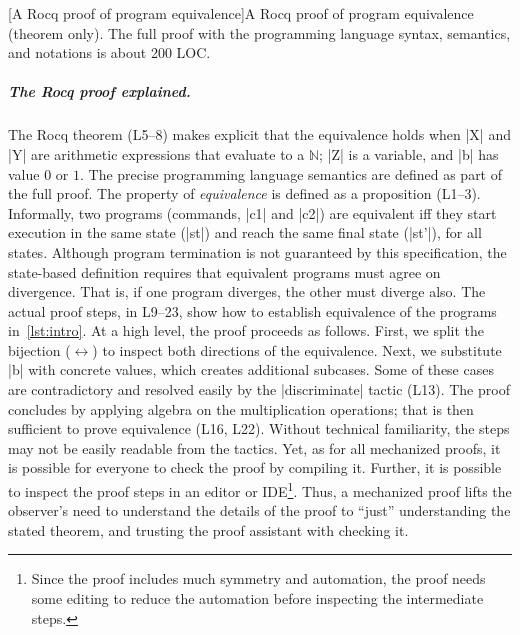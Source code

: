 \begin{center}
\begin{minipage}{\textwidth}
\captionsetup{type=lstlisting}
[A Rocq proof of program equivalence]{A Rocq proof of program equivalence (theorem only).
The full proof with the programming language syntax, semantics, and notations is about 200 LOC.}
\label{lst:eq-proof}
\end{minipage}
\end{center}

\subparagraph*{The Rocq proof explained.}
The Rocq theorem (L5--8) makes explicit that the equivalence holds when
\pr|X| and \pr|Y| are arithmetic expressions that evaluate to a \(\mathbb{N}\); \pr|Z| is a variable, and \pr|b| has value \(0\) or \(1\).
The precise programming language semantics are defined as part of the full proof.
The property of \emph{equivalence} is defined as a proposition (L1--3).
Informally, two programs (commands, \pr|c1| and \pr|c2|) are equivalent
iff they start execution in the same state (\pr|st|) and reach the same final state (\pr|st'|), for all states.
Although program termination is not guaranteed by this specification,
the state-based definition requires that equivalent programs must agree on divergence.
That is, if one program diverges, the other must diverge also.
The actual proof steps, in L9--23, show how to establish equivalence of the programs in~\autoref{lst:intro}.
At a high level, the proof proceeds as follows.
First, we split the bijection (\( \leftrightarrow \)) to inspect both directions of the equivalence.
Next, we substitute \pr|b| with concrete values, which creates additional subcases.
Some of these cases are contradictory and resolved easily by the \pr|discriminate| tactic (L13).
The proof concludes by applying algebra on the multiplication operations;
that is then sufficient to prove equivalence (L16, L22).
Without technical familiarity, the steps may not be easily readable from the tactics.
Yet, as for all mechanized proofs, it is possible for everyone to check the proof by compiling it.
Further, it is possible to inspect the proof steps in an editor or IDE\footnote{
Since the proof includes much symmetry and automation,
the proof needs some editing to reduce the automation before inspecting the intermediate steps.}.
Thus, a mechanized proof lifts the observer's need to understand the details of the proof to \enquote{just} understanding the stated theorem, and trusting the proof assistant with checking it.

